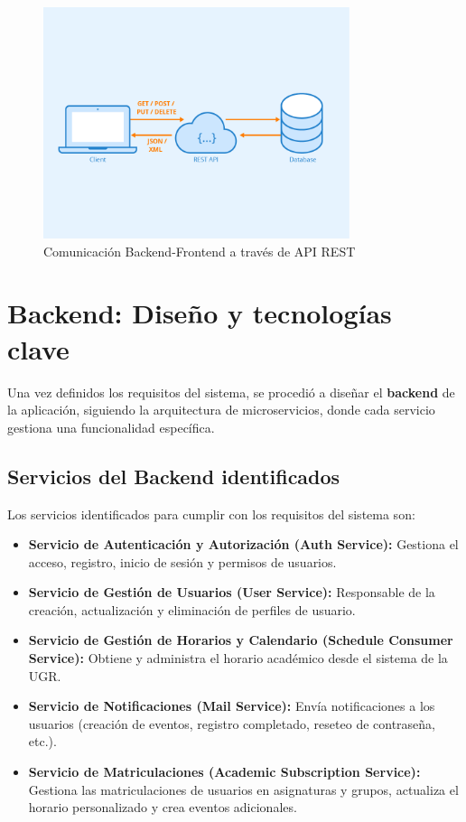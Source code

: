 \begin{figure}[H]
    \centering
    \includegraphics[width=0.8\textwidth, trim=0cm 2cm 0cm 2cm, clip]{figures/06_rest.png}
    \caption{Comunicación Backend-Frontend a través de API REST}
    \label{fig:rest_architecture}
\end{figure}

\section{Backend: Diseño y tecnologías clave}

Una vez definidos los requisitos del sistema, se procedió a diseñar el \textbf{backend} de la aplicación, siguiendo la arquitectura de microservicios, donde cada servicio gestiona una funcionalidad específica.

\subsection{Servicios del Backend identificados}

Los servicios identificados para cumplir con los requisitos del sistema son:
\begin{itemize}
    \item \textbf{Servicio de Autenticación y Autorización (Auth Service):} Gestiona el acceso, registro, inicio de sesión y permisos de usuarios.
    \item \textbf{Servicio de Gestión de Usuarios (User Service):} Responsable de la creación, actualización y eliminación de perfiles de usuario.
    \item \textbf{Servicio de Gestión de Horarios y Calendario (Schedule Consumer Service):} Obtiene y administra el horario académico desde el sistema de la UGR.
    \item \textbf{Servicio de Notificaciones (Mail Service):} Envía notificaciones a los usuarios (creación de eventos, registro completado, reseteo de contraseña, etc.).
    \item \textbf{Servicio de Matriculaciones (Academic Subscription Service):} Gestiona las matriculaciones de usuarios en asignaturas y grupos, actualiza el horario personalizado y crea eventos adicionales.
\end{itemize}

